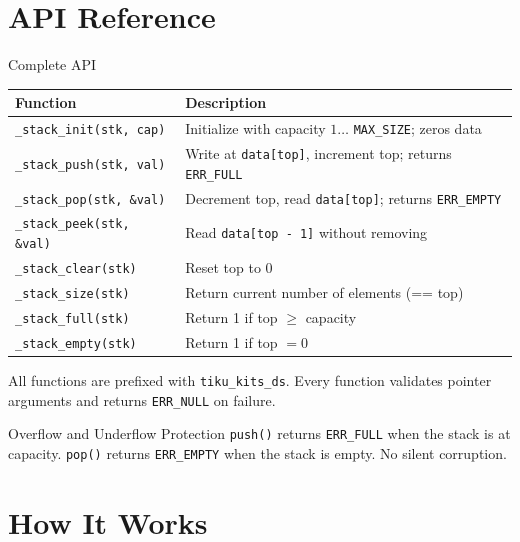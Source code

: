 \documentclass[aspectratio=169, 10pt]{beamer}
\begin{document}
\section{API Reference}

\begin{frame}[fragile]{Complete API}
\begin{table}
\centering
\small
\begin{tabular}{@{}lp{8cm}@{}}
\toprule
\textbf{Function} & \textbf{Description} \\
\midrule
\texttt{\_stack\_init(stk, cap)}
  & Initialize with capacity $1 \ldots$ \texttt{MAX\_SIZE}; zeros data \\
\texttt{\_stack\_push(stk, val)}
  & Write at \texttt{data[top]}, increment top; returns \texttt{ERR\_FULL} \\
\texttt{\_stack\_pop(stk, \&val)}
  & Decrement top, read \texttt{data[top]}; returns \texttt{ERR\_EMPTY} \\
\texttt{\_stack\_peek(stk, \&val)}
  & Read \texttt{data[top - 1]} without removing \\
\midrule
\texttt{\_stack\_clear(stk)}
  & Reset top to 0 \\
\texttt{\_stack\_size(stk)}
  & Return current number of elements (== top) \\
\texttt{\_stack\_full(stk)}
  & Return 1 if top $\geq$ capacity \\
\texttt{\_stack\_empty(stk)}
  & Return 1 if top $= 0$ \\
\bottomrule
\end{tabular}
\end{table}

\vspace{0.3em}
{\scriptsize All functions are prefixed with \texttt{tiku\_kits\_ds}.
Every function validates pointer arguments and returns \texttt{ERR\_NULL} on failure.}

\begin{alertblock}{Overflow and Underflow Protection}
\texttt{push()} returns \texttt{ERR\_FULL} when the stack is at capacity.
\texttt{pop()} returns \texttt{ERR\_EMPTY} when the stack is empty.
No silent corruption.
\end{alertblock}
\end{frame}

\section{How It Works}
\end{document}

